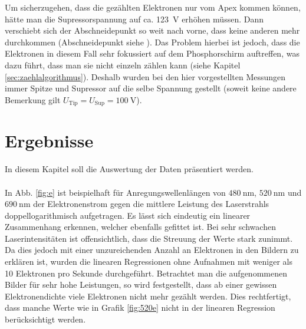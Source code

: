 \documentclass[bachelor,       %
               twoside,        %
               BCOR10mm,       %
               english,ngerman, %
               final,          %
               ]{GAUBM}
\begin{document}
Um sicherzugehen, dass die gezählten Elektronen nur vom Apex kommen können, hätte man die Supressorspannung auf ca. \SI{123}{\V} erhöhen müssen.
Dann verschiebt sich der Abschneidepunkt so weit nach vorne, dass keine anderen mehr durchkommen (Abschneidepunkt siehe \cite[S. 71 ff.]{bormann_2015}).
Das Problem hierbei ist jedoch, dass die Elektronen in diesem Fall sehr fokussiert auf dem Phosphorschirm auftreffen, was dazu führt, dass man sie nicht einzeln zählen kann (siehe Kapitel \ref{sec:zaehlalgorithmus}).
Deshalb wurden bei den hier vorgestellten Messungen immer Spitze und Supressor auf die selbe Spannung gestellt (soweit keine andere Bemerkung gilt $U_\text{Tip}=U_\text{Sup}=\SI{100}{\V}$).







\chapter{Ergebnisse}
In diesem Kapitel soll die Auswertung der Daten präsentiert werden.\\\\
In Abb. \ref{fig:e} ist beispielhaft für Anregungswellenlängen von $\SI{480}{\nano\meter}$, $\SI{520}{\nano\meter}$ und $\SI{690}{\nano\meter}$ der Elektronenstrom gegen die mittlere Leistung des Laserstrahls doppellogarithmisch aufgetragen.
Es lässt sich eindeutig ein linearer Zusammenhang erkennen, welcher ebenfalls gefittet ist.
Bei sehr schwachen Laserintensitäten ist offensichtlich, dass die Streuung der Werte stark zunimmt.
Da dies jedoch mit einer unzureichenden Anzahl an Elektronen in den Bildern zu erklären ist, wurden die linearen Regressionen ohne Aufnahmen mit weniger als 10 Elektronen pro Sekunde durchgeführt.
Betrachtet man die aufgenommenen Bilder für sehr hohe Leistungen, so wird festgestellt, dass ab einer gewissen Elektronendichte viele Elektronen nicht mehr gezählt werden.
Dies rechtfertigt, dass manche Werte wie in Grafik \ref{fig:520e} nicht in der linearen Regression berücksichtigt werden.
\end{document}
